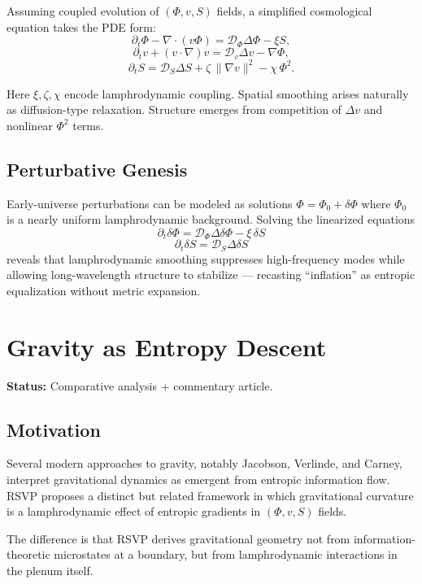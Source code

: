 \documentclass[12pt]{article}
\theoremstyle{plain}
\theoremstyle{definition}
\theoremstyle{remark}
\begin{document}
Assuming coupled evolution of $(\Phi,v,S)$ fields, a simplified cosmological
equation takes the PDE form:
\[
    \partial_t \Phi - \nabla\cdot (v\Phi) = \mathcal{D}_\Phi \Delta\Phi - \xi S,
\]
\[
    \partial_t v + (v\cdot\nabla)v = \mathcal{D}_v \Delta v - \nabla\Phi,
\]
\[
    \partial_t S = \mathcal{D}_S\Delta S + \zeta\,\|\nabla v\|^2 - \chi\,\Phi^2.
\]

Here $\xi,\zeta,\chi$ encode lamphrodynamic coupling. Spatial smoothing arises
naturally as diffusion-type relaxation. Structure emerges from competition of
$\Delta v$ and nonlinear $\Phi^2$ terms.


\subsection{Perturbative Genesis}

Early-universe perturbations can be modeled as solutions $\Phi=\Phi_0+\delta\Phi$
where $\Phi_0$ is a nearly uniform lamphrodynamic background. Solving the
linearized equations
\[
    \partial_t \delta \Phi = \mathcal{D}_\Phi \Delta \delta\Phi - \xi\,\delta S
\]
\[
    \partial_t \delta S = \mathcal{D}_S\Delta\delta S
\]
reveals that lamphrodynamic smoothing suppresses high-frequency modes while
allowing long-wavelength structure to stabilize --- recasting ``inflation'' as
entropic equalization without metric expansion.

\newpage


\section{Gravity as Entropy Descent}

\textbf{Status:} Comparative analysis + commentary article.

\subsection{Motivation}

Several modern approaches to gravity, notably Jacobson, Verlinde, and Carney,
interpret gravitational dynamics as emergent from entropic information flow.
RSVP proposes a distinct but related framework in which gravitational curvature
is a lamphrodynamic effect of entropic gradients in $(\Phi,v,S)$ fields.

The difference is that RSVP derives gravitational geometry not from
information-theoretic microstates at a boundary, but from lamphrodynamic
interactions in the plenum itself.
\end{document}
